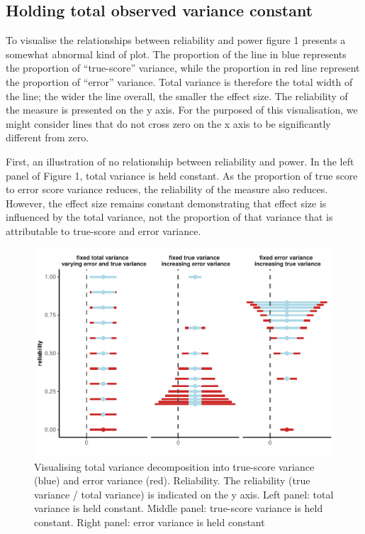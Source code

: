 \documentclass[english,,man]{apa6}
\begin{document}
\hypertarget{holding-total-observed-variance-constant}{%
\subsection{Holding total observed variance constant}\label{holding-total-observed-variance-constant}}

To visualise the relationships between reliability and power figure 1 presents a somewhat abnormal kind of plot. The proportion of the line in blue represents the proportion of \enquote{true-score} variance, while the proportion in red line represent the proportion of \enquote{error} variance. Total variance is therefore the total width of the line; the wider the line overall, the smaller the effect size. The reliability of the measure is presented on the y axis. For the purposed of this visualisation, we might consider lines that do not cross zero on the x axis to be significantly different from zero.

First, an illustration of no relationship between reliability and power. In the left panel of Figure 1, total variance is held constant. As the proportion of true score to error score variance reduces, the reliability of the measure also reduces. However, the effect size remains constant demonstrating that effect size is influenced by the total variance, not the proportion of that variance that is attributable to true-score and error variance.

\begin{figure}[H]
\includegraphics{visualising-reliability-and-power-relationships-v2_files/figure-latex/plotting1-1} \caption{Visualising total variance decomposition into true-score variance (blue) and error variance (red). Reliability. The reliability (true variance / total variance) is indicated on the y axis. Left panel: total variance is held constant. Middle panel: true-score variance is held constant. Right panel: error variance is held constant}\label{fig:plotting1}
\end{figure}
\end{document}
